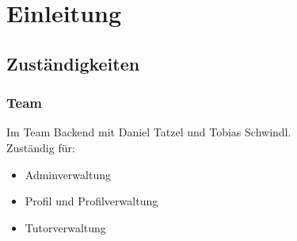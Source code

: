 \section{Einleitung}
\subsection{Zuständigkeiten}
\begin{frame}
\frametitle{Team}
 Im Team Backend mit Daniel Tatzel und Tobias Schwindl.\\
 Zuständig für:
 \begin{itemize}
  \item Adminverwaltung
  \item Profil und Profilverwaltung
  \item Tutorverwaltung
 \end{itemize}

\end{frame}

